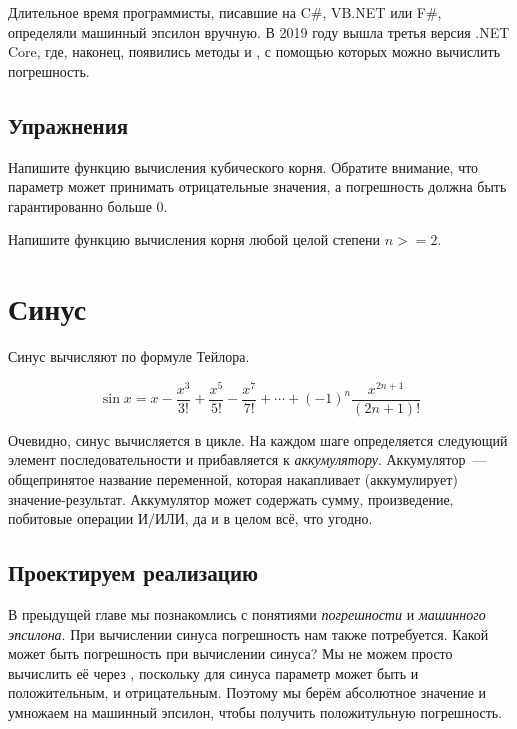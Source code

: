 Длительное время программисты, писавшие на C\#, VB.NET или F\#, определяли машинный эпсилон вручную.
В 2019 году вышла третья версия .NET Core, где, наконец, появились методы  и , с помощью которых можно вычислить погрешность.

\subsection{Упражнения}

\begin{Exercise}
  \Question
  Напишите функцию вычисления кубического корня.
  Обратите внимание, что параметр  может принимать отрицательные значения, а погрешность  должна быть гарантированно больше 0.
\end{Exercise}

\begin{Exercise}
  \Question
  Напишите функцию вычисления корня любой целой степени $n >= 2$.
\end{Exercise}

\section{Синус}

Синус вычисляют по формуле Тейлора.

$$
\sin x = x - \frac{x^3}{3!} + \frac{x^5}{5!} - \frac{x^7}{7!} + \cdots + (-1)^n \frac{x^{2n + 1}}{(2n + 1)!}
$$

Очевидно, синус вычисляется в цикле.
На каждом шаге определяется следующий элемент последовательности и прибавляется к {\em аккумулятору}.
Аккумулятор~--- общепринятое название переменной, которая накапливает (аккумулирует) значение-результат.
Аккумулятор может содержать сумму, произведение, побитовые операции И/ИЛИ, да и в целом всё, что угодно.

\subsection{Проектируем реализацию}

В преыдущей главе мы познакомлись с понятиями {\em погрешности} и {\em машинного эпсилона}.
При вычислении синуса погрешность нам также потребуется.
Какой может быть погрешность при вычислении синуса?
Мы не можем просто вычислить её через , поскольку для синуса параметр может быть и положительным, и отрицательным.
Поэтому мы берём абсолютное значение  и умножаем на машинный эпсилон, чтобы получить положитульную погрешность.

